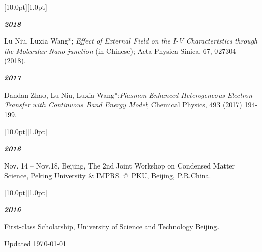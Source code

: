 \documentclass[12pt,a4paper,utf8]{report}
\begin{document}
\begin{minipage}[t]{16cm}
    \colorbox{subtitlecolor}{\raisebox{0pt}[10.0pt][1.0pt]{
        \textcolor{white}{\textsf{}}}}
\end{minipage}\par
\vspace{0.2cm}\hspace{0.5cm}
\begin{minipage}[t]{15cm}
    {\textbf{\em{2018}}}\par
    \quad Lu Niu, Luxia Wang*; {\em{Effect of External Field on the I-V Characteristics through the Molecular Nano-junction}} (in Chinese); Acta Physica Sinica, 67, 027304 (2018).\par
    \vspace{0.2cm}
    {\textbf{\em{2017}}}\par
    \quad Dandan Zhao, Lu Niu, Luxia Wang*;{\em{Plasmon Enhanced Heterogeneous Electron Transfer with Continuous Band Energy Model}}; Chemical Physics, 493 (2017) 194-199.\par
\end{minipage}\par
\vspace{0.4cm}

\begin{minipage}[t]{16cm}
    \colorbox{subtitlecolor}{\raisebox{0pt}[10.0pt][1.0pt]{
        \textcolor{white}{\textsf{}}}}
\end{minipage}\par
\vspace{0.2cm}\hspace{0.5cm}
\begin{minipage}[t]{15cm}
    {\textbf{\em{2016}}}\par
    \quad Nov. 14 -- Nov.18, Beijing, The 2nd Joint Workshop on Condensed Matter Science, Peking University \& IMPRS. @ PKU, Beijing, P.R.China.\par
    \vspace{0.2cm}
\end{minipage}\par
\vspace{0.4cm}

\begin{minipage}[t]{16cm}
    \colorbox{subtitlecolor}{\raisebox{0pt}[10.0pt][1.0pt]{
        \textcolor{white}{\textsf{}}}}
\end{minipage}\par
\vspace{0.2cm}\hspace{0.5cm}
\begin{minipage}[t]{15cm}
    {\textbf{\em{2016}}}\par
    \quad First-class Scholarship, University of Science and Technology Beijing.\par
    \vspace{0.2cm}
\end{minipage}\par
\vspace{0.4cm}

\begin{center}\vspace{1.0cm}
    Updated \monthyeardate\today
\end{center}
\end{document}
